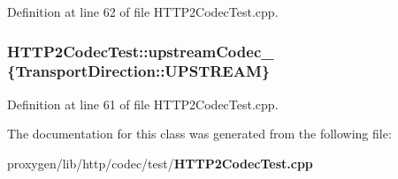 Definition at line 62 of file H\+T\+T\+P2\+Codec\+Test.\+cpp.

\subsubsection[{upstream\+Codec\+\_\+}]{ H\+T\+T\+P2\+Codec\+Test\+::upstream\+Codec\+\_\+ \{Transport\+Direction\+::\+U\+P\+S\+T\+R\+E\+AM\}\hspace{0.3cm}{\ttfamily [protected]}}\label{classHTTP2CodecTest_ab2c6c84405a88b7adff87057664194f6}


Definition at line 61 of file H\+T\+T\+P2\+Codec\+Test.\+cpp.



The documentation for this class was generated from the following file\+:\begin{DoxyCompactItemize}
\item 
proxygen/lib/http/codec/test/{\bf H\+T\+T\+P2\+Codec\+Test.\+cpp}\end{DoxyCompactItemize}
